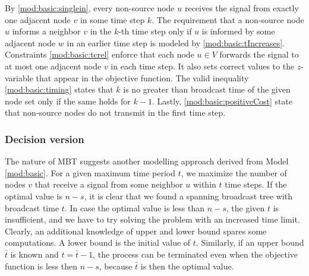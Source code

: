 By \eqref{mod:basic:singlein}, every non-source node $u$ receives the signal from exactly one adjacent node $v$ in some time step $k$.
The requirement that a non-source node $u$ informs a neighbor $v$ in the $k$-th time step only if $u$ is informed by some adjacent node $w$ in an earlier time step is modeled by \eqref{mod:basic:tIncreases}. 
Constraints \eqref{mod:basic:tcrel} enforce that each node $u\in V$ forwards the signal to at most one adjacent node $v$ in each time step.
It also sets correct values to the $z$-variable that appear in the objective function.
The valid inequality \ref{mod:basic:timing} states that $k$ is no greater than broadcast time of the given node set only if the same holds for $k-1$.
Lastly, \eqref{mod:basic:positiveCost} state that non-source nodes do not transmit in the first time step.

\subsubsection{Decision version}
\label{sec:decbasic}
The nature of MBT suggests another modelling approach derived from Model \ref{mod:basic}. 
For a given maximum time period $t$, we maximize the number of nodes $v$ that receive a signal from some neighbor $u$ within $t$ time steps.
If the optimal value is $n-s$, it is clear that we found a spanning broadcast tree with broadcast time $t$.
In case the optimal value is less than $n-s$, the given $t$ is insufficient, and we have to try solving the problem with an increased time limit.
Clearly, an additional knowledge of upper and lower bound spares some computations. 
A lower bound is the initial value of $t$. 
Similarly, if an upper bound $\bar{t}$ is known and $t=\bar{t}-1$, the process can be terminated even when the objective function is less then $n-s$, because $\bar{t}$ is then the optimal value.

